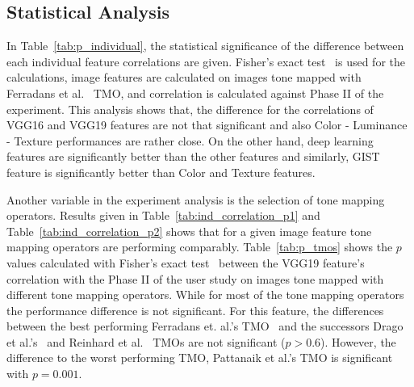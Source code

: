 \subsection{Statistical Analysis}
In Table~\ref{tab:p_individual}, the statistical significance of the difference between each individual feature correlations are given. Fisher's exact test~\cite{fisher1922interpretation} is used for the calculations, image features are calculated on images tone mapped with Ferradans et al.~\cite{ferradans2011analysis} TMO, and correlation is calculated against Phase II of the experiment. This analysis shows that, the difference for the correlations of VGG16 and VGG19 features are not that significant and also Color - Luminance - Texture performances are rather close. On the other hand, deep learning features are significantly better than the other features and similarly, GIST feature is significantly better than Color and Texture features.


\begin{table}
\caption{$p$ values for statistical significance between individual image features, calculated with Fisher's exact test.}
\label{tab:p_individual}
\centering
{}
\end{table}

Another variable in the experiment analysis is the selection of tone mapping operators. Results given in Table~\ref{tab:ind_correlation_p1} and Table~\ref{tab:ind_correlation_p2} shows that for a given image feature tone mapping operators are performing comparably. Table~\ref{tab:p_tmos} shows the $p$ values calculated with Fisher's exact test~\cite{fisher1922interpretation} between the VGG19 feature's correlation with the Phase II of the user study on images tone mapped with different tone mapping operators. While for most of the tone mapping operators the performance difference is not significant. For this feature, the differences between the best performing Ferradans et. al.'s TMO~\cite{ferradans2011analysis} and the successors Drago et al.'s~\cite{drago2003adaptive} and Reinhard et al.~\cite{reinhard2002photographic} TMOs are not significant ($p > 0.6$). However, the difference to the worst performing TMO, Pattanaik et al.'s TMO is significant with $p=0.001$.

